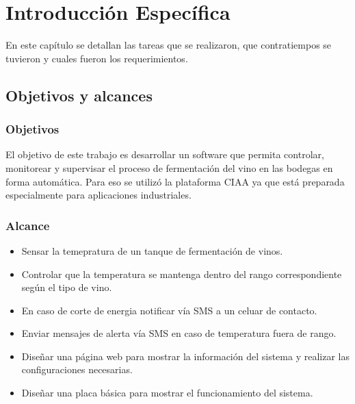 \chapter{Introducción Específica} %

\label{Chapter2}
%
En este capítulo se detallan las tareas que se realizaron, que contratiempos se tuvieron y cuales fueron los requerimientos.

\section{Objetivos y alcances}

\subsection*{Objetivos}
    El objetivo de este trabajo es desarrollar un software que permita controlar, monitorear y supervisar el proceso de fermentación del vino en las bodegas en forma automática. Para eso se utilizó la plataforma CIAA ya que está preparada especialmente para aplicaciones industriales.
\subsection*{Alcance}
  \begin{itemize}
      \item Sensar la temepratura de un tanque de fermentación de vinos.
      \item Controlar que la temperatura se mantenga dentro del rango correspondiente según el tipo de vino. 
      \item En caso de corte de energia notificar vía SMS a un celuar de contacto.
      \item Enviar mensajes de alerta vía SMS en caso de temperatura fuera de rango.
      \item Diseñar una página web para mostrar la información del sistema y realizar las configuraciones necesarias.
      \item Diseñar una placa básica para mostrar el funcionamiento del sistema.
  \end{itemize}

